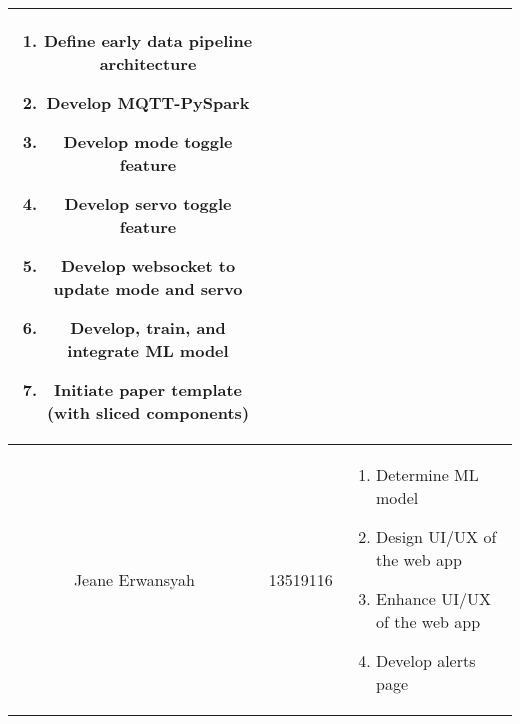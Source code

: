 \begin{table}[htbp]
\begin{center}
\begin{tabular}{|c|c|p{3cm}|}
\begin{enumerate}[leftmargin=*]
				                                         \item Define early data pipeline architecture
				                                         \item Develop MQTT-PySpark
				                                         \item Develop mode toggle feature
				                                         \item Develop servo toggle feature
				                                         \item Develop websocket to update mode and servo
				                                         \item Develop, train, and integrate ML model
				                                         \item Initiate paper template (with sliced components)
			                                         \end{enumerate}
			\\
			\hline
			Jeane Erwansyah  & 13519116            & \begin{enumerate}[leftmargin=*]
				                                         \item Determine ML model
				                                         \item Design UI/UX of the web app
				                                         \item Enhance UI/UX of the web app
				                                         \item Develop alerts page
			                                         \end{enumerate}
			\\
			\hline
		\end{tabular}
		\label{tab-divsion-of-task}
	\end{center}
\end{table}